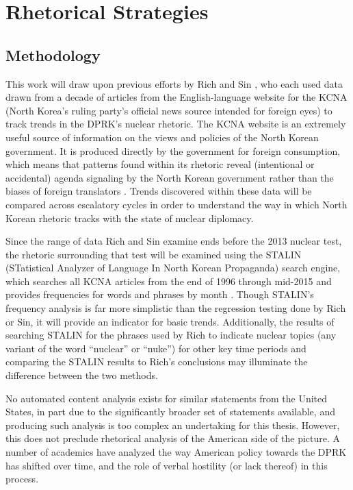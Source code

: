 \chapter{Rhetorical Strategies}

\section{Methodology}
This work will draw upon previous efforts by Rich \cite{rich12, rich14} and Sin \cite{sin}, who each used data drawn from a decade of articles from the English-language website for the KCNA (North Korea's ruling party's official news source intended for foreign eyes) to track trends in the DPRK's nuclear rhetoric. The KCNA website is an extremely useful source of information on the views and policies of the North Korean government. It is produced directly by the government for foreign consumption, which means that patterns found within its rhetoric reveal (intentional or accidental) agenda signaling by the North Korean government rather than the biases of foreign translators \cite{rich12}. Trends discovered within these data will be compared across escalatory cycles in order to understand the way in which North Korean rhetoric tracks with the state of nuclear diplomacy.

Since the range of data Rich and Sin examine ends before the 2013 nuclear test, the rhetoric surrounding that test will be examined using the STALIN (STatistical Analyzer of Language In North Korean Propaganda) search engine, which searches all KCNA articles from the end of 1996 through mid-2015 and provides frequencies for words and phrases by month \cite{stalin}. Though STALIN's frequency analysis is far more simplistic than the regression testing done by Rich or Sin, it will provide an indicator for basic trends. Additionally, the results of searching STALIN for the phrases used by Rich to indicate nuclear topics (any variant of the word ``nuclear'' or ``nuke'') for other key time periods and comparing the STALIN results to Rich's conclusions may illuminate the difference between the two methods.

No automated content analysis exists for similar statements from the United States, in part due to the significantly broader set of statements available, and producing such analysis is too complex an undertaking for this thesis. However, this does not preclude rhetorical analysis of the American side of the picture. A number of academics have analyzed the way American policy towards the DPRK has shifted over time, and the role of verbal hostility (or lack thereof) in this process.

